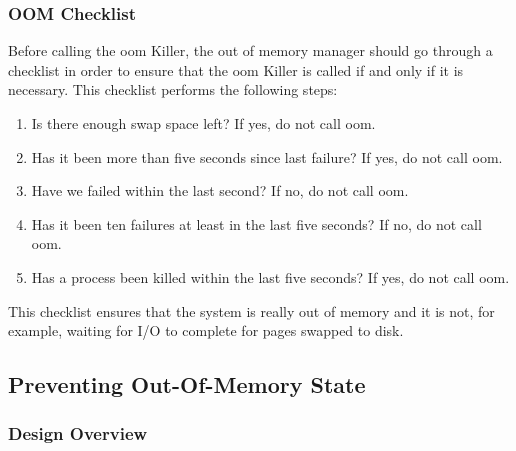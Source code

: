 \subsubsection{OOM Checklist}

Before calling the \gls{oom} Killer, the out of memory manager should go through a
checklist in order to ensure that the \gls{oom} Killer is called if and only if it is
necessary. This checklist performs the following steps:

\begin{enumerate}
    \item Is there enough swap space left? If yes, do not call \gls{oom}.
    \item Has it been more than five seconds since last failure? If yes, do not call \gls{oom}.
    \item Have we failed within the last second? If no, do not call \gls{oom}.
    \item Has it been ten failures at least in the last five seconds? If no, do not call \gls{oom}.
    \item Has a process been killed within the last five seconds? If yes, do not call \gls{oom}.
\end{enumerate}

This checklist ensures that the system is really out of memory and it is not, for example,
waiting for I/O to complete for pages swapped to disk.

\subsection{Preventing Out-Of-Memory State}\label{subme_prev_oom}

\subsubsection{Design Overview}\label{subme_prev_oom_do}

